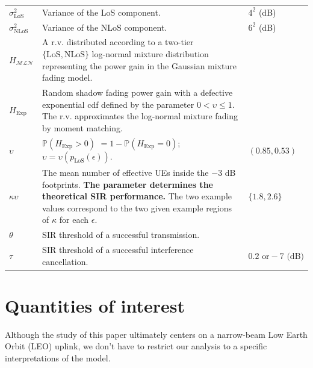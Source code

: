\documentclass[lettersize,journal]{IEEEtran}
\begin{document}
\begin{table}
\begin{center}
\begin{tabular}{|p{0.99cm}|p{4.5cm}|p{1.75cm}|}
      $\sigma^2_{\text{LoS}}$& Variance of the LoS component. & $4^2$ (dB) \\
      $\sigma^2_{\text{NLoS}}$& Variance of the NLoS component. & $6^2$ (dB) \\
      $H_{\mathcal{M}\mathcal{L}\mathcal{N}}$ & A r.v. distributed according to a two-tier $\{\text{LoS}, \text{NLoS}\}$ log-normal mixture distribution representing the power gain in the Gaussian mixture fading model.&   \\
      $H_{\text{Exp}}$ & Random shadow fading power gain with a defective exponential cdf defined by the parameter $0<\upsilon \leq 1$. The r.v. approximates the log-normal mixture fading by moment matching.&  \\
      $\upsilon$ & $\mathbb{P}(H_{\text{Exp}}>0)$ $=1-\mathbb{P}(H_{\text{Exp}}=0)$; $\upsilon = \upsilon(p_{\text{LoS}}(\epsilon))$. &$(0.85,0.53)$ \\
      $\kappa \upsilon$ & The mean number of effective UEs inside the $-3$ dB footprints. \textbf{The parameter determines the theoretical SIR performance.} The two example values correspond to the two given example regions of $\kappa$ for each $\epsilon$.&$ \{1.8,2.6\}$ \\
      $\theta$ & SIR threshold of a successful transmission.&\\
      $\tau$ & SIR threshold of a successful interference cancellation.& $0.2 \text{ or} -7\text{ (dB)}$\\  
      \hline
    \end{tabular}
  \end{center}
\end{table}   


\section{Quantities of interest}
\label{sec:analysissec}

Although the study of this paper ultimately centers on a narrow-beam Low Earth Orbit (LEO) uplink, we don't have to restrict our analysis to a specific interpretations of the model.
\end{document}
